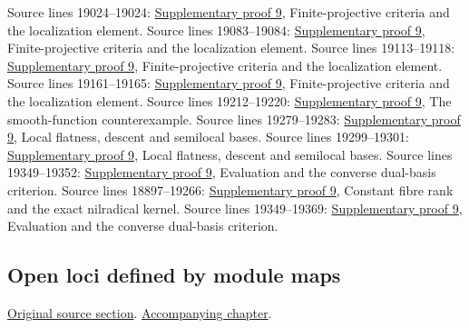 \begin{AlgebraSourceRoutes}
 Source lines 19024--19024: \hyperlink{algebra_projective_lifting_notes_20260927}{Supplementary proof 9}, Finite-projective criteria and the localization element.
 Source lines 19083--19084: \hyperlink{algebra_projective_lifting_notes_20260927}{Supplementary proof 9}, Finite-projective criteria and the localization element.
 Source lines 19113--19118: \hyperlink{algebra_projective_lifting_notes_20260927}{Supplementary proof 9}, Finite-projective criteria and the localization element.
 Source lines 19161--19165: \hyperlink{algebra_projective_lifting_notes_20260927}{Supplementary proof 9}, Finite-projective criteria and the localization element.
 Source lines 19212--19220: \hyperlink{algebra_projective_lifting_notes_20260927}{Supplementary proof 9}, The smooth-function counterexample.
 Source lines 19279--19283: \hyperlink{algebra_projective_lifting_notes_20260927}{Supplementary proof 9}, Local flatness, descent and semilocal bases.
 Source lines 19299--19301: \hyperlink{algebra_projective_lifting_notes_20260927}{Supplementary proof 9}, Local flatness, descent and semilocal bases.
 Source lines 19349--19352: \hyperlink{algebra_projective_lifting_notes_20260927}{Supplementary proof 9}, Evaluation and the converse dual-basis criterion.
 Source lines 18897--19266: \hyperlink{algebra_projective_lifting_notes_20260927}{Supplementary proof 9}, Constant fibre rank and the exact nilradical kernel.
 Source lines 19349--19369: \hyperlink{algebra_projective_lifting_notes_20260927}{Supplementary proof 9}, Evaluation and the converse dual-basis criterion.
\end{AlgebraSourceRoutes}

\subsection{Open loci defined by module maps}
\hypertarget{algebra-source-section-loci-maps}{}
\noindent\href{https://github.com/stacks/stacks-project/blob/a04446e57ec1fbc252a871afcec7752fb2807b14/algebra.tex\#L19375}{Original source section}. \href{algebra.pdf\#nameddest=section-loci-maps}{Accompanying chapter}.

